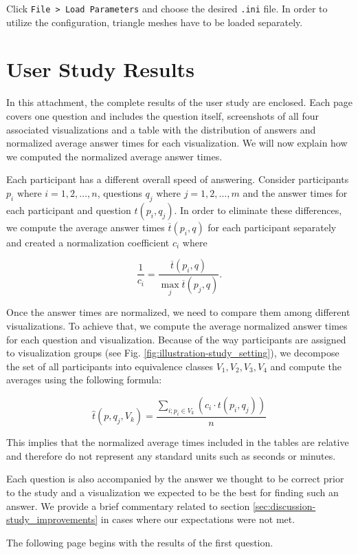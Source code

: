 Click \verb+File > Load Parameters+ and choose the desired \verb+.ini+ file. In order to utilize the configuration, triangle meshes have to be loaded separately.

\section{User Study Results}
\label{attch:complete_study_results}

In this attachment, the complete results of the user study are enclosed. Each page covers one question and includes the question itself, screenshots of all four associated visualizations and a table with the distribution of answers and normalized average answer times for each visualization. We will now explain how we computed the normalized average answer times.

Each participant has a different overall speed of answering. Consider participants \(p_i \text{ where } i = 1, 2, \dotsc, n\), questions \(q_j \text{ where } j = 1, 2, \dotsc, m\) and the answer times for each participant and question \(t(p_i,q_j)\). In order to eliminate these differences, we compute the average answer times \(\overline{t}(p_i,q)\) for each participant separately and created a normalization coefficient \(c_i\) where

\[\frac{1}{c_i} = \frac{\overline{t}(p_i,q)}{{\max_{j} \overline{t}(p_j,q)}}.\] 

Once the answer times are normalized, we need to compare them among different visualizations. To achieve that, we compute the average normalized answer times for each question and visualization. Because of the way participants are assigned to visualization groups (see Fig. \ref{fig:illustration-study_setting}), we decompose the set of all participants into equivalence classes \(V_1,V_2,V_3,V_4\) and compute the averages using the following formula:

\[\widehat{t}(p,q_j,V_k) = \frac{\sum_{i; p_i \in V_k}^{}(c_i \cdot t(p_i,q_j))}{n}\]

This implies that the normalized average times included in the tables are relative and therefore do not represent any standard units such as seconds or minutes.

Each question is also accompanied by the answer we thought to be correct prior to the study and a visualization we expected to be the best for finding such an answer. We provide a brief commentary related to section \ref{sec:discussion-study_improvements} in cases where our expectations were not met.

The following page begins with the results of the first question.
\clearpage

